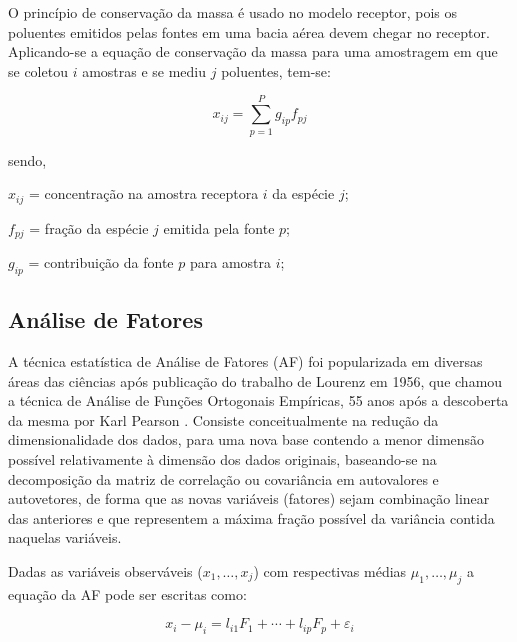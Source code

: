 O princípio de conservação da massa é usado no modelo receptor, pois os 
poluentes emitidos pelas fontes em uma bacia aérea devem chegar no 
receptor. Aplicando-se a equação de conservação da massa para uma amostragem 
em que se coletou $i$ amostras e se mediu $j$ poluentes, tem-se:

\begin{equation}
  \label{eq:conservacaomassa}
  x_{ij} = \sum_{p=1}^{P} g_{ip}f_{pj} %
\end{equation} 

sendo,
\begin{itemize}
  \begin{spacing}{1.0}
    \item $x_{ij}$ = concentração na amostra receptora $i$ da espécie $j$;
    \item $f_{pj}$ = fração da espécie $j$ emitida pela fonte $p$;
    \item $g_{ip}$ = contribuição da fonte $p$ para amostra $i$;
  \end{spacing}
\end{itemize}

\subsection{Análise de Fatores}

A técnica estatística de Análise de Fatores (AF) foi popularizada em diversas 
áreas das ciências após publicação do trabalho de Lourenz em 1956, que chamou 
a técnica de Análise de Funções Ortogonais Empíricas, 55 anos após a 
descoberta da mesma por Karl Pearson \citep{bartholomew2011}. Consiste 
conceitualmente na redução da dimensionalidade dos dados, para uma nova base 
contendo a menor dimensão possível relativamente à dimensão dos dados originais, 
baseando-se na decomposição da matriz de correlação ou covariância em 
autovalores e autovetores, de forma que as novas variáveis (fatores) sejam 
combinação linear das anteriores e que representem a máxima fração possível da 
variância contida naquelas variáveis.

Dadas as variáveis observáveis ($x_1,\dots,x_j$) com 
respectivas médias $\mu_1,\dots,\mu_j$ a equação da AF pode ser escritas como: 
 
\begin{equation}
  \label{eq:af}
  x_i-\mu_i = l_{i1} F_1 + \cdots + l_{ip} F_p + \varepsilon_i 
\end{equation}

